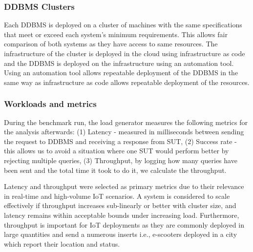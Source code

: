 \subsubsection{DDBMS Clusters}

Each DDBMS is deployed on a cluster of machines with the same specifications that meet or exceed each system's minimum requirements.
This allows fair comparison of both systems as they have access to same resources.
The infrastructure of the cluster is deployed in the cloud using infrastructure as code and the DDBMS is deployed on the infrastructure using an automation tool.
Using an automation tool allows repeatable deployment of the DDBMS in the same way as infrastructure as code allows repeatable deployment of the resources.

\subsubsection{Workloads and metrics}
During the benchmark run, the load generator measures the following metrics for the analysis afterwards:
(1) Latency - measured in milliseconds between sending the request to DDBMS and receiving a response from SUT,
(2) Success rate - this allows us to avoid a situation where one SUT would perform better by rejecting multiple queries,
(3) Throughput, by logging how many queries have been sent and the total time it took to do it, we calculate the throughput.

Latency and throughput were selected as primary metrics due to their relevance in real-time and high-volume IoT scenarios.
A system is considered to scale effectively if throughput increases sub-linearly or better with cluster size, and latency remains within acceptable bounds under increasing load.\cite{hossfeldComparingScalabilityCommunication2023}
Furthermore, throughput is important for IoT deployments as they are commonly deployed in large quantities and send a numerous inserts i.e., e-scooters deployed in a city which report their location and status.

